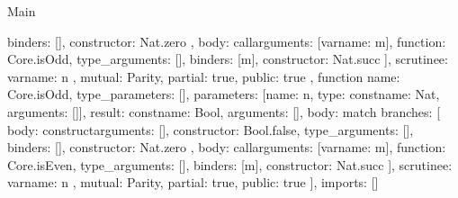 \begin{lexlean}{Main}
\begin{toolingmodule}
{{{{            binders: [],
            constructor: Nat.zero
          },
          {
            body: call{arguments: [var{name: m}], function: Core.isOdd, type_arguments: []},
            binders: [m],
            constructor: Nat.succ
          }
        ],
        scrutinee: var{name: n}
      },
      mutual: Parity,
      partial: true,
      public: true
    },
    function{
      name: Core.isOdd,
      type_parameters: [],
      parameters: [{name: n, type: const{name: Nat, arguments: []}}],
      result: const{name: Bool, arguments: []},
      body: match{
        branches: [
          {
            body: construct{arguments: [], constructor: Bool.false, type_arguments: []},
            binders: [],
            constructor: Nat.zero
          },
          {
            body: call{arguments: [var{name: m}], function: Core.isEven, type_arguments: []},
            binders: [m],
            constructor: Nat.succ
          }
        ],
        scrutinee: var{name: n}
      },
      mutual: Parity,
      partial: true,
      public: true
    }
  ],
  imports: []
}
\end{toolingmodule}
\end{lexlean}
